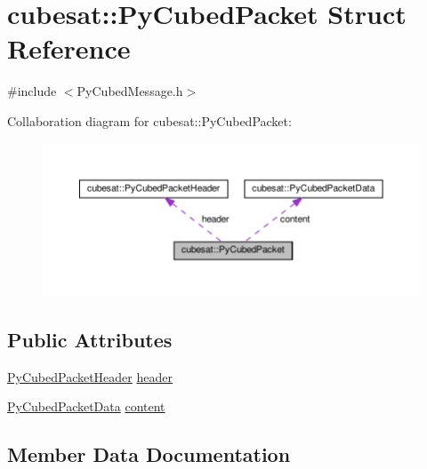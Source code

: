 \hypertarget{structcubesat_1_1PyCubedPacket}{}\section{cubesat\+:\+:Py\+Cubed\+Packet Struct Reference}
\label{structcubesat_1_1PyCubedPacket}


{\ttfamily \#include $<$Py\+Cubed\+Message.\+h$>$}



Collaboration diagram for cubesat\+:\+:Py\+Cubed\+Packet\+:\nopagebreak
\begin{figure}[H]
\begin{center}
\leavevmode
\includegraphics[width=350pt]{structcubesat_1_1PyCubedPacket__coll__graph}
\end{center}
\end{figure}
\subsection*{Public Attributes}
\begin{DoxyCompactItemize}
\item 
\hyperlink{structcubesat_1_1PyCubedPacketHeader}{Py\+Cubed\+Packet\+Header} \hyperlink{structcubesat_1_1PyCubedPacket_a3fee0058b22c1346c8d21b2985c6d49d}{header}
\item 
\hyperlink{structcubesat_1_1PyCubedPacketData}{Py\+Cubed\+Packet\+Data} \hyperlink{structcubesat_1_1PyCubedPacket_af33aeae9a8ae102140146acd32484ba0}{content}
\end{DoxyCompactItemize}


\subsection{Member Data Documentation}
\mbox{\label{structcubesat_1_1PyCubedPacket_af33aeae9a8ae102140146acd32484ba0}} 
